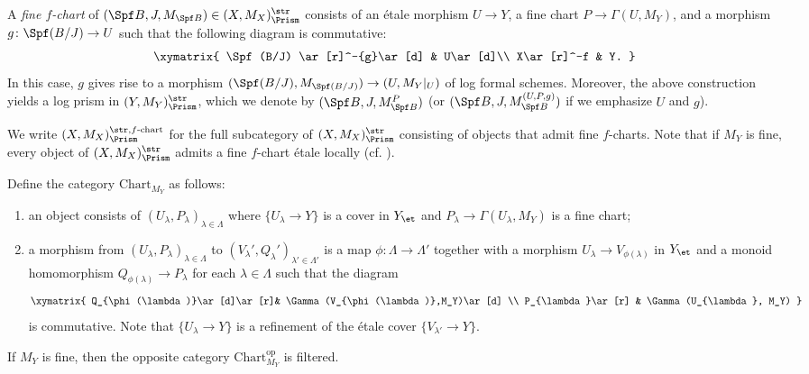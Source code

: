 \begin{defn}
    A \emph{fine $f$-chart} of $(\Spf B, J, M_{\Spf B})\in (X,M_X)_\Prism^{\str}$ consists of an \'etale morphism $U\rightarrow Y$, a fine chart $P\rightarrow \Gamma(U, M_Y)$, and a morphism $g\colon \Spf (B/J)\rightarrow U$ such that the following diagram is commutative:
    \[
    \xymatrix{
\Spf (B/J) \ar[r]^-{g}\ar[d] & U\ar[d]\\
    X\ar[r]^-f & Y.
    }
    \]
    In this case, $g$ gives rise to a morphism $(\Spf (B/J),M_{\Spf (B/J)})\rightarrow (U, M_Y|_U)$ of log formal schemes.
    Moreover, the above construction yields a log prism in $(Y,M_Y)_{\Prism}^{\str}$, which we denote by $(\Spf B, J, M_{\Spf B}^P)$ (or $(\Spf B, J, M_{\Spf B}^{(U,P,g)})$ if we emphasize $U$ and $g$).

    We write $(X,M_X)_\Prism^{\str, f\text{-}\mathrm{chart}}$ for the full subcategory of $(X,M_X)_\Prism^{\str}$ consisting of objects that admit fine $f$-charts. Note that if $M_Y$ is fine, every object of $(X,M_X)_\Prism^{\str}$ admits a fine $f$-chart \'etale locally (cf. \cite[Rem.~4.2]{koshikawa}).
\end{defn}


Define the category $\mathrm{Chart}_{M_Y}$ as follows:
\begin{enumerate}
    \item an object consists of $(U_\lambda, P_\lambda)_{\lambda\in \Lambda}$ where $\{ U_\lambda\rightarrow Y\}$ is a cover in $Y_\et$ and $P_\lambda\rightarrow \Gamma(U_\lambda,M_Y)$ is a fine chart;
    \item a morphism from $(U_\lambda, P_\lambda)_{\lambda\in \Lambda}$ to $(V_\lambda', Q_\lambda')_{\lambda'\in \Lambda'}$ is a map $\phi\colon \Lambda\rightarrow \Lambda'$ together with a morphism  $U_{\lambda}\rightarrow V_{\phi(\lambda)}$ in $Y_\et$ and a monoid homomorphism $Q_{\phi(\lambda)}\rightarrow P_{\lambda}$ for each $\lambda\in \Lambda$ such that the diagram
\[
\xymatrix{
Q_{\phi(\lambda)}\ar[d]\ar[r]& \Gamma(V_{\phi(\lambda)},M_Y)\ar[d] \\
P_{\lambda}\ar[r] & \Gamma(U_{\lambda}, M_Y)
}
\]
is commutative. Note that $\{U_\lambda \rightarrow Y\}$ is a refinement of the \'etale cover $\{ V_{\lambda'}\rightarrow Y\}$.
\end{enumerate}

\begin{lem}\label{lem: fine charts are filtered}
If $M_Y$ is fine, then the opposite category $\mathrm{Chart}_{M_Y}^\mathrm{op}$ is filtered.
\end{lem}


